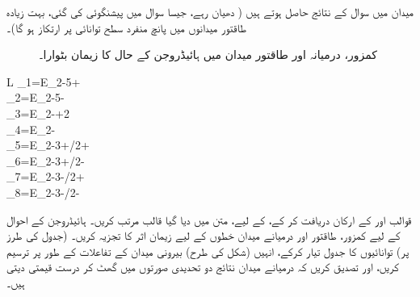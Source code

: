  میدان  میں سوال  کے نتائج حاصل ہوتے ہیں ( دھیان رہے، جیسا سوال  میں پیشنگوئی کی گئی، بہت زیادہ طاقتور میدانوں میں پانچ منفرد سطح توانائی پر ارتکاز ہو گا)۔
\begin{figure}
\centering
{}
\caption{کمزور، درمیانہ اور طاقتور میدان میں ہائیڈروجن کے  حال کا زیمان بٹوارا۔}
\label{شکل_غیر_تابع_اضطراب_کمزور_درمیانہ_طاقتور}
\end{figure}
%
\begin{table}
\caption{
مہین ساخت اور زیمان بٹوارا کے ساتھ، ہائیڈروجن کے  احوال کی سطحیں توانائی۔
}
\label{جدول_غیر_مضطرب_سطحیں_توانائی_برائے_دو}
\centering
\renewcommand{\arraystretch}{1.5}
\begin{tabular}{L}
\toprule
\epsilon_1=E_2-5\gamma+\beta\\
\epsilon_2=E_2-5\gamma-\beta\\
\epsilon_3=E_2-\gamma+2\beta\\
\epsilon_4=E_2-\beta\\
\epsilon_5=E_2-3\gamma+\beta/2+\\
\epsilon_6=E_2-3\gamma+\beta/2-\\
\epsilon_7=E_2-3\gamma-\beta/2+\\
\epsilon_8=E_2-3\gamma-\beta/2-\\
\bottomrule
\end{tabular}
\end{table}

قوالب  اور  کے ارکان دریافت کر کے،  کے لیے، متن میں دیا گیا قالب  مرتب کریں۔
ہائیڈروجن کے  احوال کے لیے کمزور، طاقتور اور درمیانے میدان خطوں کے لیے زیمان اثر کا تجزیہ کریں۔ (جدول  کی طرز پر) توانائیوں کا جدول تیار کرکے، انہیں (شکل  کی طرح) بیرونی میدان کے تفاعلات کے طور پر ترسیم کریں، اور تصدیق کریں کہ درمیانے میدان نتائج دو تحدیدی صورتوں میں گھٹ کر درست قیمتی دیتی ہیں۔ 


